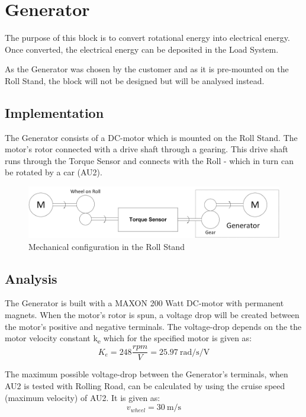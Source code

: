 \newpage
\section{Generator}
The purpose of this block is to convert rotational energy into electrical energy. Once converted, the electrical energy can be deposited in the Load System.

As the Generator was chosen by the customer and as it is pre-mounted on the Roll Stand, the block will not be designed but will be analysed instead.

\subsection{Implementation}
The Generator consists of a DC-motor which is mounted on the Roll Stand. The motor's rotor connected with a drive shaft through a gearing. This drive shaft runs through the Torque Sensor and connects with the Roll - which in turn can be rotated by a car (AU2).

\begin{figure}[H]
	\centering
	\includegraphics[width=1\linewidth]{Hardware/Pictures/Mechanical_Connections}
	\caption{Mechanical configuration in the Roll Stand}
	\label{fig:Generator_Implementation}
\end{figure}

\subsection{Analysis}
The Generator is built with a MAXON 200 Watt DC-motor with permanent magnets. When the motor's rotor is spun, a voltage drop will be created between the motor's positive and negative terminals. The voltage-drop depends on the the motor velocity constant k\textsubscript{e} which for the specified motor is given as:
\begin{equation}
	K_e = 248 \frac{rpm}{V} = \SI[per-mode=fraction]{25.97}{\radian \per \second \per \volt}
\end{equation}

The maximum possible voltage-drop between the Generator's terminals, when AU2 is tested with Rolling Road, can be calculated by using the cruise speed (maximum velocity) of AU2. It is given as:
\begin{equation}
	v_{wheel} = \SI[per-mode=fraction]{30}{\meter \per \second}
\end{equation}


